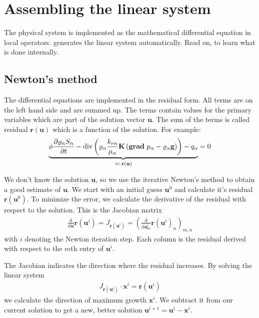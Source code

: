 \section{Assembling the linear system}
\label{sc_linearsystem}
The physical system is implemented as the mathematical differential equation in
local operators. \Dumux generates the linear system automatically. Read on, to
learn what is done internally.

\subsection{Newton's method}
The differential equations are implemented in the residual form. All terms are
on the left hand side and are summed up. The terms contain values for the primary
variables which are part of the solution vector $\textbf{u}$. The sum of the terms
is called residual $\textbf{r}(\textbf{u})$ which is a function of the solution. For
example:
\begin{align*}
\underbrace{
  \phi \frac{\partial \varrho_\alpha S_\alpha}{\partial t}
 -
 \text{div} \left(
 \varrho_\alpha \frac{k_{r\alpha}}{\mu_\alpha} \mathbf{K}
 \left(\operatorname{\mathbf{grad}}\, p_\alpha - \varrho_{\alpha} \mathbf{g} \right)
 \right) - q_\alpha} _
{=: \, \textbf{r}(\textbf{u})}
= 0
\end{align*}

We don't know the solution $\textbf{u}$, so we use the iterative Newton's method to
obtain a good estimate of $\textbf{u}$. We start with an initial guess $\textbf{u}^0$ and
calculate it's residual $\textbf{r}(\textbf{u}^0)$. To minimize the error, we calculate
the derivative of the residual with respect to the solution. This is the Jacobian
matrix
\begin{align*}
  \frac{\text{d}}{\text{d}\textbf{u}}\textbf{r} \left(\textbf{u}^i\right)
  = J_{\textbf{r} \left(\textbf{u}^i\right)}
  = \left(\frac{\text{d}}{\text{d}\textbf{u}^i_m}\textbf{r} \left(\textbf{u}^i\right)_n\right)_{m,n}
\end{align*}
with $i$ denoting the Newton iteration step.
Each column is the residual derived with respect to the $m$th entry of $\textbf{u}^i$.

The Jacobian indicates the direction where the residual increases. By solving the
linear system
\begin{align*}
  J_{\textbf{r}(\textbf{u}^i)} \cdot \textbf{x}^i = \textbf{r}(\textbf{u}^i)
\end{align*}
we calculate the direction of maximum growth $\textbf{x}^i$. We subtract it from
our current solution to get a new, better solution
$\textbf{u}^{i+1} = \textbf{u}^i - \textbf{x}^i$.

